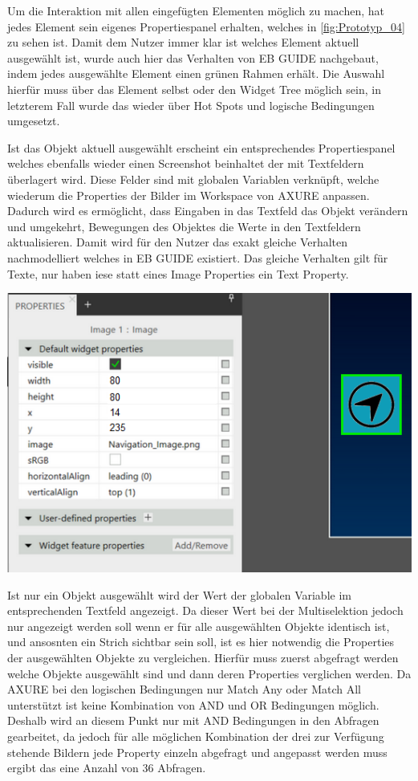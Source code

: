 Um die Interaktion mit allen eingefügten Elementen möglich zu machen, hat jedes Element sein eigenes Propertiespanel erhalten, welches in \cref{fig:Prototyp_04} zu sehen ist.
Damit dem Nutzer immer klar ist welches Element aktuell ausgewählt ist, wurde auch hier das Verhalten von EB GUIDE nachgebaut, indem jedes ausgewählte Element einen grünen Rahmen erhält.
Die Auswahl hierfür muss über das Element selbst oder den Widget Tree möglich sein, in letzterem Fall wurde das wieder über Hot Spots und logische Bedingungen umgesetzt.

Ist das Objekt aktuell ausgewählt erscheint ein entsprechendes Propertiespanel welches ebenfalls wieder einen Screenshot beinhaltet der mit Textfeldern überlagert wird.
Diese Felder sind mit globalen Variablen verknüpft, welche wiederum die Properties der Bilder im Workspace von AXURE anpassen.
Dadurch wird es ermöglicht, dass Eingaben in das Textfeld das Objekt verändern und umgekehrt, Bewegungen des Objektes die Werte in den Textfeldern aktualisieren.
Damit wird für den Nutzer das exakt gleiche Verhalten nachmodelliert welches in EB GUIDE existiert.
Das gleiche Verhalten gilt für Texte, nur haben iese statt eines Image Properties ein Text Property.

\begin{center}
  \includegraphics[scale=0.8]{figures/Prototyp_04.PNG}
  \label{fig:Prototyp_04}
\end{center}

Ist nur ein Objekt ausgewählt wird der Wert der globalen Variable im entsprechenden Textfeld angezeigt.
Da dieser Wert bei der Multiselektion jedoch nur angezeigt werden soll wenn er für alle ausgewählten Objekte identisch ist, und ansosnten ein Strich sichtbar sein soll, ist es hier notwendig die Properties der ausgewählten Objekte zu vergleichen.
Hierfür muss zuerst abgefragt werden welche Objekte ausgewählt sind und dann deren Properties verglichen werden.
Da AXURE bei den logischen Bedingungen nur \glqq Match Any\grqq{} oder \glqq Match All\grqq{} unterstützt ist keine Kombination von AND und OR Bedingungen möglich.
Deshalb wird an diesem Punkt nur mit AND Bedingungen in den Abfragen gearbeitet, da jedoch für alle möglichen Kombination der drei zur Verfügung stehende Bildern jede Property einzeln abgefragt und angepasst werden muss ergibt das eine Anzahl von 36 Abfragen.

